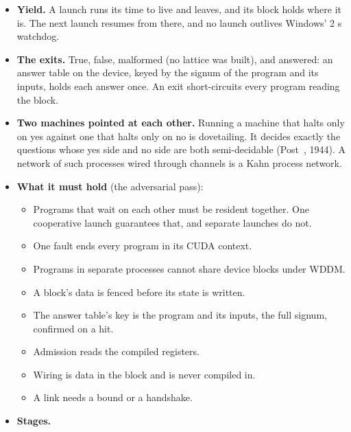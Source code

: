 \begin{enumerate}
\begin{itemize}
\begin{itemize}
\item the program's signum, the run's generation, and the launch that owns it;
\item the scheduler's command (run, yield, stop) and the grant: registers a thread, threads, device bytes (the local frame times the threads) and shared bytes (\texttt{engine\_\allowbreak{}config.\allowbreak{}h});
\item the state, the exits, and the error's module and site;
\item the check-ins, and the progress: lanes and refusals;
\item the wiring: the blocks it reads and the blocks that read it, each link's words produced and consumed, the result, and the parent;
\item a CRC-64 that seals the block whenever no launch holds it.
\end{itemize}
\item \textbf{Yield.} A launch runs its time to live and leaves, and its block holds where it is. The next launch resumes from there, and no launch outlives Windows' 2 s watchdog.
\item \textbf{The exits.} True, false, malformed (no lattice was built), and answered: an answer table on the device, keyed by the signum of the program and its inputs, holds each answer once. An exit short-circuits every program reading the block.
\item \textbf{Two machines pointed at each other.} Running a machine that halts only on yes against one that halts only on no is dovetailing. It decides exactly the questions whose yes side and no side are both semi-decidable (Post~\cite{src:Post-1944}, 1944). A network of such processes wired through channels is a Kahn process network.
\item \textbf{What it must hold} (the adversarial pass):

\begin{itemize}
\item Programs that wait on each other must be resident together. One cooperative launch guarantees that, and separate launches do not.
\item One fault ends every program in its CUDA context.
\item Programs in separate processes cannot share device blocks under WDDM.
\item A block's data is fenced before its state is written.
\item The answer table's key is the program and its inputs, the full signum, confirmed on a hit.
\item Admission reads the compiled registers.
\item Wiring is data in the block and is never compiled in.
\item A link needs a bound or a handshake.
\end{itemize}
\item \textbf{Stages.}


\end{itemize}
\end{enumerate}
